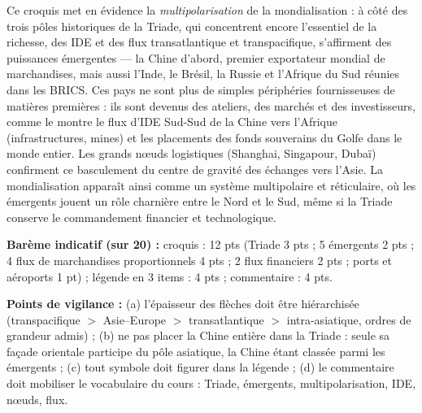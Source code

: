 \documentclass[11pt]{article}
\begin{document}
\begin{corrige}
Ce croquis met en évidence la \emph{multipolarisation} de la mondialisation : à côté des trois pôles historiques de la Triade, qui concentrent encore l'essentiel de la richesse, des IDE et des flux transatlantique et transpacifique, s'affirment des puissances émergentes — la Chine d'abord, premier exportateur mondial de marchandises, mais aussi l'Inde, le Brésil, la Russie et l'Afrique du Sud réunies dans les BRICS. Ces pays ne sont plus de simples périphéries fournisseuses de matières premières : ils sont devenus des ateliers, des marchés et des investisseurs, comme le montre le flux d'IDE Sud-Sud de la Chine vers l'Afrique (infrastructures, mines) et les placements des fonds souverains du Golfe dans le monde entier. Les grands nœuds logistiques (Shanghai, Singapour, Dubaï) confirment ce basculement du centre de gravité des échanges vers l'Asie. La mondialisation apparaît ainsi comme un système multipolaire et réticulaire, où les émergents jouent un rôle charnière entre le Nord et le Sud, même si la Triade conserve le commandement financier et technologique.

\textbf{Barème indicatif (sur 20) :} croquis : 12 pts (Triade 3 pts ; 5 émergents 2 pts ; 4 flux de marchandises proportionnels 4 pts ; 2 flux financiers 2 pts ; ports et aéroports 1 pt) ; légende en 3 items : 4 pts ; commentaire : 4 pts.

\textbf{Points de vigilance :} (a) l'épaisseur des flèches doit être hiérarchisée (transpacifique $>$ Asie--Europe $>$ transatlantique $>$ intra-asiatique, ordres de grandeur admis) ; (b) ne pas placer la Chine entière dans la Triade : seule sa façade orientale participe du pôle asiatique, la Chine étant classée parmi les émergents ; (c) tout symbole doit figurer dans la légende ; (d) le commentaire doit mobiliser le vocabulaire du cours : Triade, émergents, multipolarisation, IDE, nœuds, flux.
\end{corrige}
\end{document}
